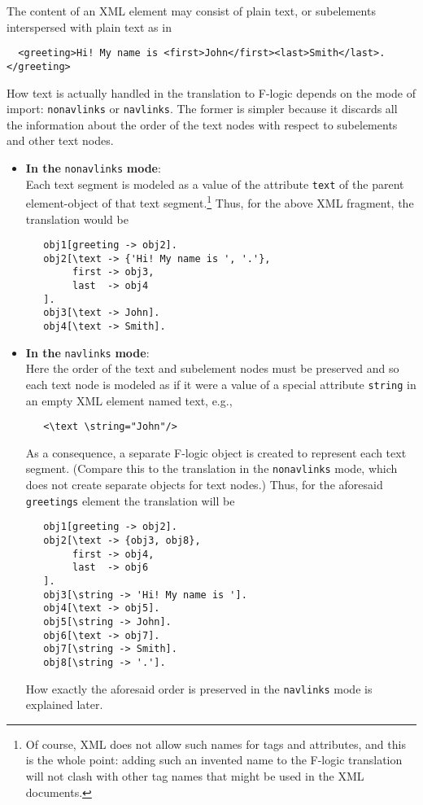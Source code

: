 The content of an XML element may consist of plain text, or
subelements interspersed with plain text as in
\begin{verbatim}
  <greeting>Hi! My name is <first>John</first><last>Smith</last>.</greeting> 
\end{verbatim}
How text is actually handled in the translation to F-logic depends on the
mode of import: \texttt{nonavlinks} or \texttt{navlinks}. The former is
simpler because it discards all the information about the order of the text
nodes with respect to subelements and other text nodes.
\begin{itemize}
\item  \textbf{In the} \texttt{nonavlinks} \textbf{mode}:\\
  Each text segment is modeled as a value of the attribute
  \texttt{\bs{}text} of the parent element-object of that text
  segment.\footnote{
    Of course, XML does not allow such names for tags and attributes, and this
    is the whole point: adding such an invented name to the F-logic
    translation  will not clash with other
    tag names that might be used in the XML documents.
    }
  Thus, for the above XML fragment, the translation would be
\begin{verbatim}
   obj1[greeting -> obj2].
   obj2[\text -> {'Hi! My name is ', '.'},
        first -> obj3,
        last  -> obj4
   ].
   obj3[\text -> John].
   obj4[\text -> Smith].
\end{verbatim}
\item \textbf{In the} \texttt{navlinks} \textbf{mode}:\\
  Here the order of the text and subelement nodes must be preserved and so
  each text node is modeled as if it were a value of a special attribute
  \texttt{\bs{}string} in an empty XML element named \bs{}text, e.g., 
\begin{verbatim}
   <\text \string="John"/>  
\end{verbatim}
  As a consequence, a separate F-logic object is created to represent each
  text segment. (Compare this to the translation in the \texttt{nonavlinks}
  mode, which does not create separate objects for text nodes.) 
  Thus, for the aforesaid \texttt{greetings} element the translation will be 
\begin{verbatim}
   obj1[greeting -> obj2].
   obj2[\text -> {obj3, obj8},
        first -> obj4,
        last  -> obj6
   ].
   obj3[\string -> 'Hi! My name is '].
   obj4[\text -> obj5].
   obj5[\string -> John].
   obj6[\text -> obj7].
   obj7[\string -> Smith].
   obj8[\string -> '.'].
\end{verbatim}
  How exactly the aforesaid order is preserved in the \texttt{navlinks} 
  mode is explained later.
\end{itemize}

